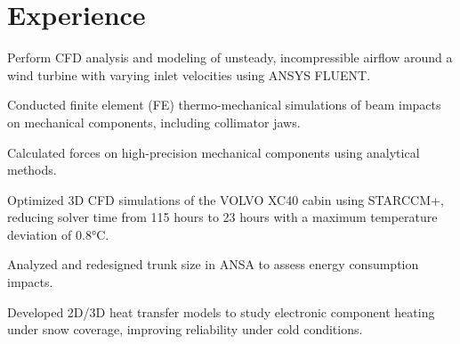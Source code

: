 \documentclass[]{hussain-resume-openfont}
\begin{document}
%
%
%
%

\begin{minipage}[t]{0.63\textwidth}


\section{Experience}
\vspace{0.9em}
\begin{tightemize}
\justifying
\item Perform CFD analysis and modeling of unsteady, incompressible airflow around a wind turbine with varying inlet velocities using ANSYS FLUENT.
\end{tightemize}
\sectionsep

\begin{tightemize}
     \justifying
     \item Conducted finite element (FE) thermo-mechanical simulations of beam impacts on mechanical components, including collimator jaws.
     \item Calculated forces on high-precision mechanical components using analytical methods.
\end{tightemize}
\sectionsep

\begin{tightemize}
       \justifying 
        \item Optimized 3D CFD simulations of the VOLVO XC40 cabin using STARCCM+, reducing solver time from 115 hours to 23 hours with a maximum temperature deviation of 0.8°C.
        \item Analyzed and redesigned trunk size in ANSA to assess energy consumption impacts.
        \item Developed 2D/3D heat transfer models to study electronic component heating under snow coverage, improving reliability under cold conditions.
\end{tightemize}
\sectionsep


\end{minipage}
\end{document}
